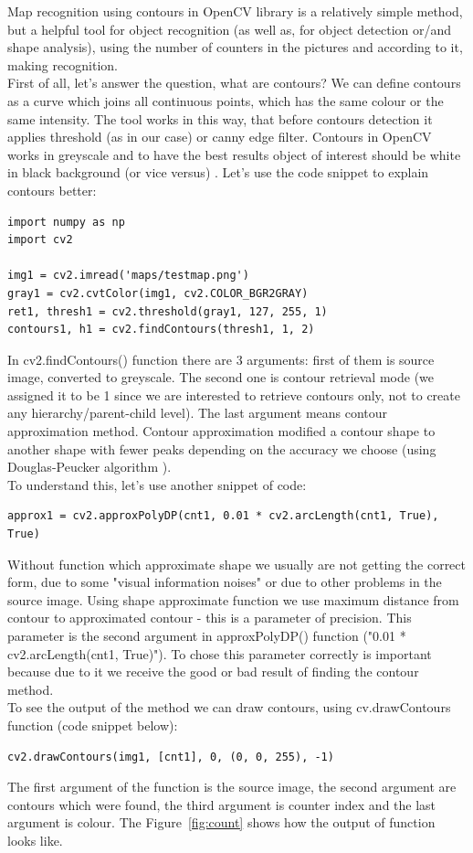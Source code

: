 Map recognition using contours in OpenCV library is a relatively simple method, but a helpful tool for object recognition (as well as, for object detection or/and shape analysis), using the number of counters in the pictures and according to it, making recognition. \\
First of all, let's answer the question, what are contours? We can define contours as a curve which joins all continuous points, which has the same colour or the same intensity. The tool works in this way, that before contours detection it applies threshold (as in our case) or canny edge filter. Contours in OpenCV works in greyscale and to have the best results object of interest should be white in black background (or vice versus) \cite{contours}. 
Let's use the code snippet to explain contours better:
\begin{lstlisting}
import numpy as np
import cv2

img1 = cv2.imread('maps/testmap.png')
gray1 = cv2.cvtColor(img1, cv2.COLOR_BGR2GRAY)
ret1, thresh1 = cv2.threshold(gray1, 127, 255, 1)
contours1, h1 = cv2.findContours(thresh1, 1, 2)
\end{lstlisting}

In cv2.findContours() function there are $3$ arguments: first of them is source image, converted to greyscale. The second one is contour retrieval mode (we assigned it to be 1 since we are interested to retrieve contours only, not to create any hierarchy/parent-child level). The last argument means contour approximation method. Contour approximation modified a contour shape to another shape with fewer peaks depending on the accuracy we choose (using Douglas-Peucker algorithm \cite{aprox}). \\
To understand this, let's use another snippet of code:
\begin{lstlisting}
approx1 = cv2.approxPolyDP(cnt1, 0.01 * cv2.arcLength(cnt1, True), True)
\end{lstlisting}
Without function which approximate shape we usually are not getting the correct form, due to some "visual information noises" or due to other problems in the source image. Using shape approximate function we use maximum distance from contour to approximated contour - this is a parameter of precision. This parameter is the second argument in approxPolyDP() function ("0.01 * cv2.arcLength(cnt1, True)"). To chose this parameter correctly is important because due to it we receive the good or bad result of finding the contour method.\\
To see the output of the method we can draw contours, using cv.drawContours function (code snippet below):
\begin{lstlisting}
cv2.drawContours(img1, [cnt1], 0, (0, 0, 255), -1)
\end{lstlisting}
The first argument of the function is the source image, the second argument are contours which were found, the third argument is counter index and the last argument is colour. The Figure~\ref{fig:count} shows how the output of function looks like.

